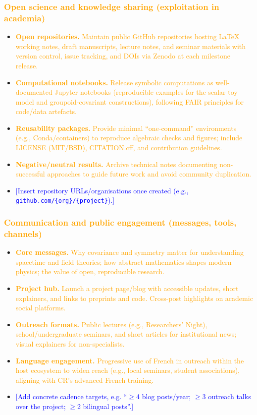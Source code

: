 \documentclass[11pt,draftproposal]{msca-pf}
\begin{document}
\subsubsection*{\textcolor{orange}{Open science and knowledge sharing (exploitation in academia)}}
\begin{itemize}[noitemsep,topsep=2pt]
  \item \textcolor{orange}{\textbf{Open repositories.} Maintain public GitHub repositories hosting LaTeX working notes, draft manuscripts, lecture notes, and seminar materials with version control, issue tracking, and DOIs via Zenodo at each milestone release.}
  \item \textcolor{orange}{\textbf{Computational notebooks.} Release symbolic computations as well-documented Jupyter notebooks (reproducible examples for the scalar toy model and groupoid-covariant constructions), following FAIR principles for code/data artefacts.}
  \item \textcolor{orange}{\textbf{Reusability packages.} Provide minimal “one-command” environments (e.g., Conda/containers) to reproduce algebraic checks and figures; include LICENSE (MIT/BSD), CITATION.cff, and contribution guidelines.}
  \item \textcolor{orange}{\textbf{Negative/neutral results.} Archive technical notes documenting non-successful approaches to guide future work and avoid community duplication.}
  \item \textcolor{blue}{[Insert repository URLs/organisations once created (e.g., \texttt{github.com/\{org\}/\{project\}}).]}
\end{itemize}

\subsubsection*{\textcolor{orange}{Communication and public engagement (messages, tools, channels)}}
\begin{itemize}[noitemsep,topsep=2pt]
  \item \textcolor{orange}{\textbf{Core messages.} Why covariance and symmetry matter for understanding spacetime and field theories; how abstract mathematics shapes modern physics; the value of open, reproducible research.}
  \item \textcolor{orange}{\textbf{Project hub.} Launch a project page/blog with accessible updates, short explainers, and links to preprints and code. Cross-post highlights on academic social platforms.}
  \item \textcolor{orange}{\textbf{Outreach formats.} Public lectures (e.g., Researchers’ Night), school/undergraduate seminars, and short articles for institutional news; visual explainers for non-specialists.}
  \item \textcolor{orange}{\textbf{Language engagement.} Progressive use of French in outreach within the host ecosystem to widen reach (e.g., local seminars, student associations), aligning with CR’s advanced French training.}
  \item \textcolor{blue}{[Add concrete cadence targets, e.g. “\(\geq\)4 blog posts/year; \(\geq\)3 outreach talks over the project; \(\geq\)2 bilingual posts”.]}
\end{itemize}
\end{document}

